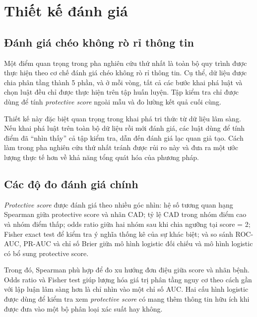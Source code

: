 \blocksep

\section{Thiết kế đánh giá}

\blocksep

\subsection{Đánh giá chéo không rò rỉ thông tin}

\blocksep

Một điểm quan trọng trong pha nghiên cứu thứ nhất là toàn bộ quy trình được thực hiện theo cơ chế đánh giá chéo không rò rỉ thông tin. Cụ thể, dữ liệu được chia phân tầng thành 5 phần, và ở mỗi vòng, tất cả các bước khai phá luật và chọn luật đều chỉ được thực hiện trên tập huấn luyện. Tập kiểm tra chỉ được dùng để tính \textit{protective score} ngoài mẫu và đo lường kết quả cuối cùng.

\blocksep

Thiết kế này đặc biệt quan trọng trong khai phá tri thức từ dữ liệu lâm sàng. Nếu khai phá luật trên toàn bộ dữ liệu rồi mới đánh giá, các luật dùng để tính điểm đã “nhìn thấy” cả tập kiểm tra, dẫn đến đánh giá lạc quan giả tạo. Cách làm trong pha nghiên cứu thứ nhất tránh được rủi ro này và đưa ra một ước lượng thực tế hơn về khả năng tổng quát hóa của phương pháp.

\blocksep

\subsection{Các độ đo đánh giá chính}

\blocksep

\textit{Protective score} được đánh giá theo nhiều góc nhìn: hệ số tương quan hạng Spearman giữa protective score và nhãn CAD; tỷ lệ CAD trong nhóm điểm cao và nhóm điểm thấp; odds ratio giữa hai nhóm sau khi chia ngưỡng tại score = 2; Fisher exact test để kiểm tra ý nghĩa thống kê của sự khác biệt; và so sánh ROC-AUC, PR-AUC và chỉ số Brier giữa mô hình logistic đối chiếu và mô hình logistic có bổ sung protective score.

\blocksep

Trong đó, Spearman phù hợp để đo xu hướng đơn điệu giữa score và nhãn bệnh. Odds ratio và Fisher test giúp lượng hóa giá trị phân tầng nguy cơ theo cách gần với lập luận lâm sàng hơn là chỉ nhìn vào một chỉ số AUC. Hai cấu hình logistic được dùng để kiểm tra xem \textit{protective score} có mang thêm thông tin hữu ích khi được đưa vào một bộ phân loại xác suất hay không.

